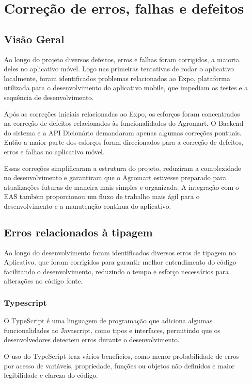 \chapter[Correção de erros, falhas e defeitos]{Correção de erros, falhas e defeitos}

\section{Visão Geral}
Ao longo do projeto diversos defeitos, erros e falhas foram corrigidos, a maioria deles no aplicativo móvel. Logo nas primeiras tentativas de rodar o aplicativo localmente, foram identificados problemas relacionados ao Expo, plataforma utilizada para o desenvolvimento do aplicativo mobile, que impediam os testes e a sequência de desenvolvimento.

Após as correções iniciais relacionadas ao Expo, os esforços foram concentrados na correção de defeitos relacionados às funcionalidades do Agromart. O Backend do sistema e a API Dicionário demandaram apenas algumas correções pontuais. Então a maior parte dos esforços foram direcionados para a correção de defeitos, erros e falhas no aplicativo móvel.

Essas correções simplificaram a estrutura do projeto, reduziram a complexidade no desenvolvimento e garantiram que o Agromart estivesse preparado para atualizações futuras de maneira mais simples e organizada. A integração com o EAS também proporcionou um fluxo de trabalho mais ágil para o desenvolvimento e a manutenção contínua do aplicativo.

\section{Erros relacionados à tipagem}
Ao longo do desenvolvimento foram identificados diversos erros de tipagem no Aplicativo, que foram corrigidos para garantir melhor entendimento do código facilitando o desenvolvimento, reduzindo o tempo e esforço necessários para alterações no código fonte.

\subsection{Typescript}
O TypeScript é uma linguagem de programação que adiciona algumas funcionalidades ao Javascript, como tipos e interfaces, permitindo que os desenvolvedores detectem erros durante o desenvolvimento. 

O uso do TypeScript traz vários benefícios, como menor probabilidade de erros por acesso de variáveis, propriedade, funções ou objetos não definidos e maior legibilidade e clareza do código.

